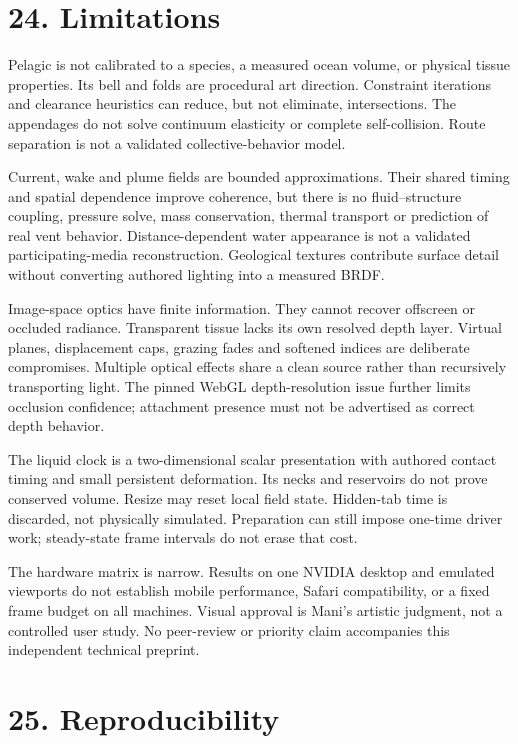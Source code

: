 \documentclass[
  english,
  11pt,
]{article}
\begin{document}
\section{24. Limitations}\label{limitations}

Pelagic is not calibrated to a species, a measured ocean volume, or
physical tissue properties. Its bell and folds are procedural art
direction. Constraint iterations and clearance heuristics can reduce,
but not eliminate, intersections. The appendages do not solve continuum
elasticity or complete self-collision. Route separation is not a
validated collective-behavior model.

Current, wake and plume fields are bounded approximations. Their shared
timing and spatial dependence improve coherence, but there is no
fluid--structure coupling, pressure solve, mass conservation, thermal
transport or prediction of real vent behavior. Distance-dependent water
appearance is not a validated participating-media reconstruction.
Geological textures contribute surface detail without converting
authored lighting into a measured BRDF.

Image-space optics have finite information. They cannot recover
offscreen or occluded radiance. Transparent tissue lacks its own
resolved depth layer. Virtual planes, displacement caps, grazing fades
and softened indices are deliberate compromises. Multiple optical
effects share a clean source rather than recursively transporting light.
The pinned WebGL depth-resolution issue further limits occlusion
confidence; attachment presence must not be advertised as correct depth
behavior.

The liquid clock is a two-dimensional scalar presentation with authored
contact timing and small persistent deformation. Its necks and
reservoirs do not prove conserved volume. Resize may reset local field
state. Hidden-tab time is discarded, not physically simulated.
Preparation can still impose one-time driver work; steady-state frame
intervals do not erase that cost.

The hardware matrix is narrow. Results on one NVIDIA desktop and
emulated viewports do not establish mobile performance, Safari
compatibility, or a fixed frame budget on all machines. Visual approval
is Mani's artistic judgment, not a controlled user study. No peer-review
or priority claim accompanies this independent technical preprint.

\section{25. Reproducibility}\label{reproducibility}
\end{document}
